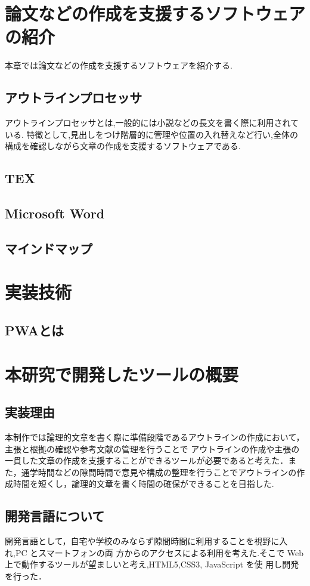 \documentclass[a4j,12pt]{jarticle}
\begin{document}
\newpage
\section{論文などの作成を支援するソフトウェアの紹介}
本章では論文などの作成を支援するソフトウェアを紹介する.
\subsection{アウトラインプロセッサ}
アウトラインプロセッサとは,一般的には小説などの長文を書く際に利用されている.
特徴として,見出しをつけ階層的に管理や位置の入れ替えなど行い,全体の構成を確認しながら文章の作成を支援するソフトウェアである.
\subsection{TEX}

\subsection{Microsoft Word}

\subsection{マインドマップ}

\newpage
\section{実装技術}
\subsection{PWAとは}

\newpage
\section{本研究で開発したツールの概要}
\subsection{実装理由}
本制作では論理的文章を書く際に準備段階であるアウトラインの作成において，主張と根拠の確認や参考文献の管理を行うことで
アウトラインの作成や主張の一貫した文章の作成を支援することができるツールが必要であると考えた．また，通学時間などの隙間時間で意見や構成の整理を行うことでアウトラインの作成時間を短くし，論理的文章を書く時間の確保ができることを目指した.

\subsection{開発言語について}
開発言語として，自宅や学校のみならず隙間時間に利用することを視野に入れ,PC とスマートフォンの両
方からのアクセスによる利用を考えた.そこで Web 上で動作するツールが望ましいと考え,HTML5,CSS3, JavaScript を使
用し開発を行った．
\end{document}
